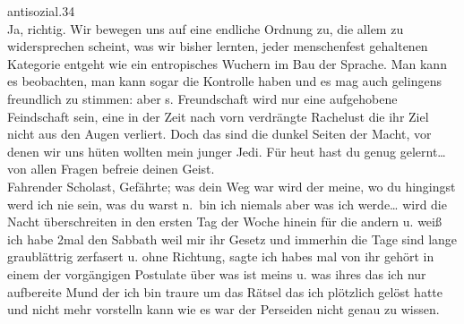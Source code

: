 \documentclass[
]{article}
\begin{document}
antisozial.34\\
Ja, richtig. Wir bewegen uns auf eine endliche Ordnung zu, die allem zu
widersprechen scheint, was wir bisher lernten, jeder menschenfest
gehaltenen Kategorie entgeht wie ein entropisches Wuchern im Bau der
Sprache. Man kann es beobachten, man kann sogar die Kontrolle haben und
es mag auch gelingens freundlich zu stimmen: aber s. Freundschaft wird
nur eine aufgehobene Feindschaft sein, eine in der Zeit nach vorn
verdrängte Rachelust die ihr Ziel nicht aus den Augen verliert. Doch das
sind die dunkel Seiten der Macht, vor denen wir uns hüten wollten mein
junger Jedi. Für heut hast du genug gelernt\ldots{} von allen Fragen
befreie deinen Geist.\\
Fahrender Scholast, Gefährte; was dein Weg war wird der meine, wo du
hingingst werd ich nie sein, was du warst n.~bin ich niemals aber was
ich werde\ldots{} wird die Nacht überschreiten in den ersten Tag der
Woche hinein für die andern u. weiß ich habe 2mal den Sabbath weil mir
ihr Gesetz und immerhin die Tage sind lange graublättrig zerfasert u.
ohne Richtung, sagte ich habes mal von ihr gehört in einem der
vorgängigen Postulate über was ist meins u. was ihres das ich nur
aufbereite Mund der ich bin traure um das Rätsel das ich plötzlich
gelöst hatte und nicht mehr vorstelln kann wie es war der Perseiden
nicht genau zu wissen.
\end{document}
